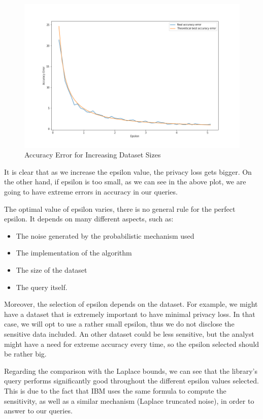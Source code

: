 \begin{figure}[!htb]\centering
    \includegraphics[width=1\textwidth]{images/epsilon_measurements.png}
    \caption{Accuracy Error for Increasing Dataset Sizes}
\end{figure}

It is clear that as we increase the epsilon value, the privacy loss gets bigger. On the other hand, if epsilon is too small, as we can see in the above plot, we are going to have extreme errors in accuracy in our queries. 

The optimal value of epsilon varies, there is no general rule for the perfect epsilon. It depends on many different aspects, such as:

\begin{itemize}
    \item The noise generated by the probabilistic mechanism used
    \item The implementation of the algorithm
    \item The size of the dataset
    \item The query itself.
\end{itemize}

Moreover, the selection of epsilon depends on the dataset. For example, we might have a dataset that is extremely important to have minimal privacy loss. In that case, we will opt to use a rather small epsilon, thus we do not disclose the sensitive data included. An other dataset could be less sensitive, but the analyst might have a need for extreme accuracy every time, so the epsilon selected should be rather big.

Regarding the comparison with the Laplace bounds, we can see that the library's query performs significantly good throughout the different epsilon values selected. This is due to the fact that IBM uses the same formula to compute the sensitivity, as well as a similar mechanism (Laplace truncated noise), in order to answer to our queries.

